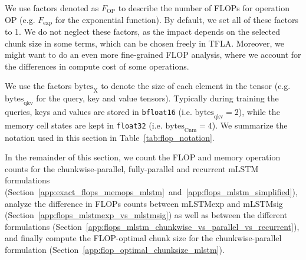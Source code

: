 \documentclass{article}
\begin{document}
    We use factors denoted as $F_\text{OP}$ to describe the number of FLOPs for operation $\text{OP}$ (e.g. $F_\text{exp}$ for the exponential function).
    By default, we set all of these factors to 1.
    We do not neglect these factors, as the impact depends on the selected chunk size in some terms, which can be chosen freely in TFLA. 
    Moreover, we might want to do an even more fine-grained FLOP analysis, where we account for the differences in compute cost of some operations.

    We use the factors $\text{bytes}_\text{X}$ to denote the size of each element in the tensor (e.g. $\text{bytes}_\text{qkv}$ for the query, key and value tensors).
    Typically during training the queries, keys and values are stored in \texttt{bfloat16} (i.e. $\text{bytes}_\text{qkv} = 2$), while the memory cell states are kept in \texttt{float32} (i.e. $\text{bytes}_\text{Cnm} = 4$).
    We summarize the notation used in this section in Table~\ref{tab:flop_notation}.

    In the remainder of this section, we count the FLOP and memory operation counts for the chunkwise-parallel, fully-parallel and recurrent mLSTM formulations (Section~\ref{app:exact_flops_memops_mlstm}~and~\ref{app:flops_mlstm_simplified}), analyze the difference in FLOPs counts between mLSTMexp and mLSTMsig (Section~\ref{app:flops_mlstmexp_vs_mlstmsig}) as well as between the different formulations (Section~\ref{app:flops_mlstm_chunkwise_vs_parallel_vs_recurrent}), and finally compute the FLOP-optimal chunk size for the chunkwise-parallel formulation (Section~\ref{app:flop_optimal_chunksize_mlstm}).
\end{document}
